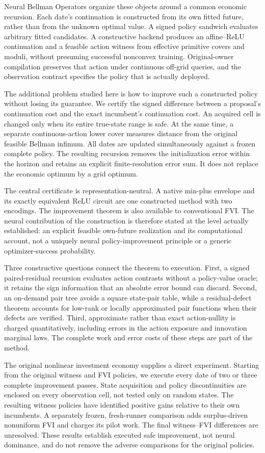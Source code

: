 \documentclass[ecta,nameyear,draft]{econsocart}
\begin{document}
Neural Bellman Operators organize these objects around a common economic recursion. Each date's continuation is constructed from its own fitted future, rather than from the unknown optimal value. A signed policy sandwich evaluates arbitrary fitted candidates. A constructive backend produces an affine--ReLU continuation and a feasible action witness from effective primitive covers and moduli, without presuming successful nonconvex training. Original-owner compilation preserves that action under continuous off-grid queries, and the observation contract specifies the policy that is actually deployed.

The additional problem studied here is how to improve such a constructed policy without losing its guarantee. We certify the signed difference between a proposal's continuation cost and the exact incumbent's continuation cost. An acquired cell is changed only when its entire true-state range is safe. At the same time, a separate continuous-action lower cover measures distance from the original feasible Bellman infimum. All dates are updated simultaneously against a frozen complete policy. The resulting recursion removes the initialization error within the horizon and retains an explicit finite-resolution error sum. It does not replace the economic optimum by a grid optimum.

The central certificate is representation-neutral. A native min-plus envelope and its exactly equivalent ReLU circuit are one constructed method with two encodings. The improvement theorem is also available to conventional FVI. The neural contribution of the construction is therefore stated at the level actually established: an explicit feasible own-future realization and its computational account, not a uniquely neural policy-improvement principle or a generic optimizer-success probability.

Three constructive questions connect the theorem to execution. First, a signed paired-residual recursion evaluates action contrasts without a policy-value oracle; it retains the sign information that an absolute error bound can discard. Second, an on-demand pair tree avoids a square state-pair table, while a residual-defect theorem accounts for low-rank or locally approximated pair functions when their defects are verified. Third, approximate rather than exact action-nullity is charged quantitatively, including errors in the action exposure and innovation marginal laws. The complete work and error costs of these steps are part of the method.

The original nonlinear investment economy supplies a direct experiment. Starting from the original witness and FVI policies, we execute every date of two or three complete improvement passes. State acquisition and policy discontinuities are enclosed on every observation cell, not tested only on random states. The resulting witness policies have identified positive gains relative to their own incumbents. A separately frozen, fresh-runner comparison adds surplus-driven nonuniform FVI and charges its pilot work. The final witness--FVI differences are unresolved. These results establish executed safe improvement, not neural dominance, and do not remove the adverse comparisons for the original policies.
\end{document}
